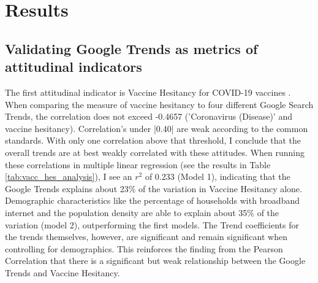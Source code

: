 \section{Results}

\subsection{Validating Google Trends as metrics of attitudinal indicators}




The first attitudinal indicator is Vaccine Hesitancy for COVID-19 vaccines
\citep{vaches_data}. When comparing the measure of vaccine hesitancy to four
different Google Search Trends, the correlation does not exceed -0.4657
('Coronavirus (Disease)' and vaccine hesitancy). Correlation's under |0.40| are 
weak according to the common standards. With only one correlation 
above that threshold, I conclude that the overall trends are at best weakly
correlated with these attitudes. When running these
correlations in multiple linear regression (see the results in Table
\ref{tab:vacc_hes_analysis}), I see an $r^2$ of 0.233 (Model 1),
indicating that the Google Trends explains about 23\% of
the variation in Vaccine Hesitancy alone. Demographic characteristics like the
percentage of households with broadband internet and the population density are
able to explain about 35\% of the variation (model 2), outperforming the first
models. The Trend coefficients for the trends themselves, however, are
significant and remain significant when controlling for demographics. This reinforces the finding from the Pearson Correlation that there is a significant but weak relationship between the Google Trends and Vaccine Hesitancy.


